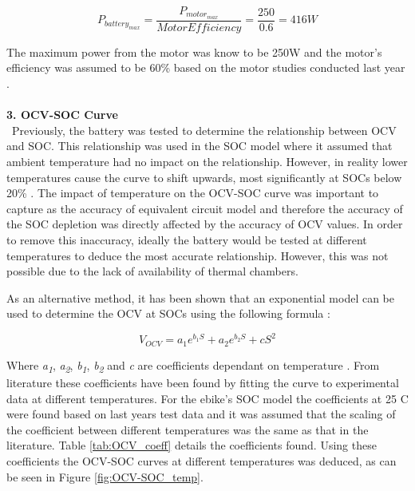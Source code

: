 \documentclass[a4paper, 10pt]{article}
\numberwithin{equation}{section}
\begin{document}
\begin{equation}
    P_{battery_{max}} = \frac{P_{motor_{max}}}{Motor Efficiency} = \frac{250}{0.6} = 416W
\end{equation}

The maximum power from the motor was know to be 250W and the motor's efficiency was assumed to be 60\% based on the motor studies conducted last year \cite{report:motor_spec}.
\\
\\
\textbf{3. OCV-SOC Curve}
\\
\
Previously, the battery was tested to determine the relationship between OCV and SOC. This relationship was used in the SOC model where it assumed that ambient temperature had no impact on the relationship. However, in reality lower temperatures cause the curve to shift upwards, most significantly at SOCs below 20\% \cite{report:OCV-SOC_temp}. The impact of temperature on the OCV-SOC curve was important to capture as the accuracy of equivalent circuit model and therefore the accuracy of the SOC depletion was directly affected by the accuracy of OCV values. In order to remove this inaccuracy, ideally the battery would be tested at different temperatures to deduce the most accurate relationship. However, this was not possible due to the lack of availability of thermal chambers. 

As an alternative method, it has been shown that an exponential model can be used to determine the OCV at SOCs using the following formula \cite{report:OCV_temp} \cite{report:ocv-temp-eqn}:

\begin{equation}
    V_{OCV} = a_1e^{b_1S}+a_2e^{b_2S}+cS^2
\end{equation}

Where \textit{a\textsubscript{1}}, \textit{a\textsubscript{2}}, \textit{b\textsubscript{1}}, \textit{b\textsubscript{2}} and \textit{c} are coefficients dependant on temperature \cite{report:OCV_temp}. From literature these coefficients have been found by fitting the curve to experimental data at different temperatures. For the ebike's SOC model the coefficients at 25 \degree C were found based on last years test data and it was assumed that the scaling of the coefficient between different temperatures was the same as that in the literature. Table \ref{tab:OCV_coeff} details the coefficients found. Using these coefficients the OCV-SOC curves at different temperatures was deduced, as can be seen in Figure \ref{fig:OCV-SOC_temp}.
\end{document}
